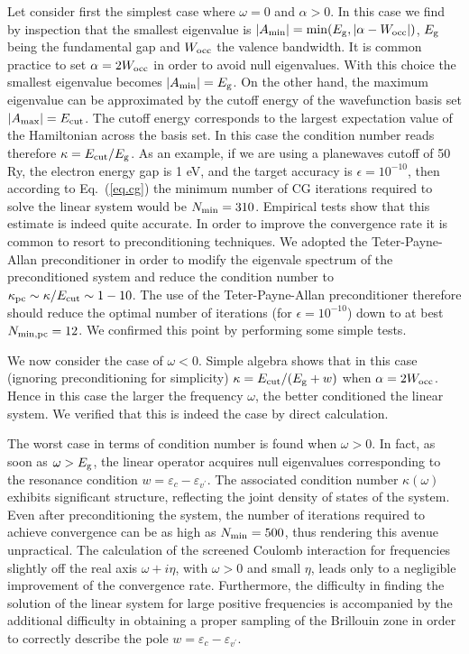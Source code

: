 \documentclass[twocolumn,prb,showpacs,superscriptaddress]{revtex4}
\def\w{\omega}
\def\E{\varepsilon}
\def\vp{{v^\prime}}
\begin{document}
Let consider first the simplest case where $\w=0$ and $\alpha>0$. In this case 
we find by inspection that the smallest eigenvalue is $|A_{\rm min}|= \min(E_{\rm g}, |\alpha-W_{\rm occ}|)$, 
$E_{\rm g}$ being the fundamental gap and $W_{\rm occ}$ the valence bandwidth.
It is common practice to set $\alpha=2W_{\rm occ}$ in order to avoid null eigenvalues.
\cite{baroni.rmp} With this choice the smallest eigenvalue becomes $|A_{\rm min}|=E_{\rm g}$.
On the other hand, the maximum eigenvalue can be approximated by the
cutoff energy of the wavefunction basis set $|A_{\rm max}|=E_{\rm cut}$.
The cutoff energy corresponds to the largest expectation value of the Hamiltonian 
across the basis set.
In this case the condition number reads therefore $\kappa = E_{\rm cut}/E_{\rm g}$.
As an example, if we are using a planewaves cutoff of 50 Ry, the electron energy
gap is 1 eV, and the target accuracy is $\epsilon=10^{-10}$, then according to
Eq.\ (\ref{eq.cg}) the minimum number of CG iterations required to solve 
the linear system would be $N_{\rm min} = 310$. Empirical tests show that this 
estimate is indeed quite accurate.
In order to improve the convergence rate it is common to resort to preconditioning
techniques. We adopted the Teter-Payne-Allan preconditioner\cite{tpa}
in order to modify the eigenvale spectrum of the preconditioned system
and reduce the condition number to $\kappa_{\rm pc} \sim \kappa / E_{\rm cut} \sim 1-10$.
The use of the Teter-Payne-Allan preconditioner therefore should reduce the optimal 
number of iterations (for $\epsilon=10^{-10}$) down to at best $N_{\rm min,pc} = 12$. 
We confirmed this point by performing some simple tests.

We now consider the case of $\w<0$. Simple algebra shows that in this case
(ignoring preconditioning for simplicity) $\kappa = E_{\rm cut}/(E_{\rm g} + w)$
when $\alpha = 2W_{\rm occ}$. Hence in this case the larger the frequency $\w$,
the better conditioned the linear system. We verified that this is indeed the
case by direct calculation.

The worst case in terms of condition number is found when $\w>0$. 
In fact, as soon as $\w>E_{\rm g}$, the linear operator acquires null eigenvalues 
corresponding to the resonance condition $w = \E_c - \E_\vp$. The associated condition
number $\kappa(\w)$ exhibits significant structure, reflecting
the joint density of states of the system. Even after preconditioning the system, 
the number of iterations required to achieve convergence can be as high as 
$N_{\rm min} = 500$, thus rendering this avenue unpractical.
The calculation of the screened Coulomb interaction for frequencies slightly
off the real axis $\w+i\eta$, with $\w>0$ and small $\eta$, leads only to a negligible
improvement of the convergence rate.
Furthermore, the difficulty in finding the solution of the linear system 
for large positive frequencies is accompanied by the additional difficulty 
in obtaining a proper sampling of the Brillouin zone in order to correctly 
describe the pole $w = \E_c - \E_\vp$.
\end{document}
